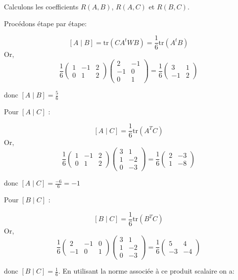 \documentclass[
]{article}
\begin{document}
Calculons les coefficients \(R(A ,B)\), \(R(A ,C)\) et \(R(B ,C)\).

Procédons étape par étape:

\[[ A \mid B] = \text{tr}(CA^tWB)= \frac{1}{6}\text{tr}(A^tB)\] Or,
\[\frac{1}{6} \begin{pmatrix}
1 & -1 & 2 \\
0 & 1 & 2
\end{pmatrix} \begin{pmatrix}
2 & -1  \\
-1 & 0 \\
0 & 1 
\end{pmatrix} = \frac{1}{6} \begin{pmatrix}
3 & 1  \\
-1 & 2 
\end{pmatrix}\]

donc \([A \mid B] = \frac{5}{6}\)

Pour \([A \mid C]\) :

\[
[A \mid C] = \frac{1}{6} \text{tr}(A^T C) \] Or,
\[ \frac{1}{6} \begin{pmatrix} 
1 & -1 & 2 \\ 
0 & 1 & 2 
\end{pmatrix} \begin{pmatrix} 
3 & 1 \\ 
1 & -2 \\ 
0 & -3 
\end{pmatrix} = \frac{1}{6} \begin{pmatrix}
2 & -3  \\
1 & -8 
\end{pmatrix}\]

donc \([A \mid C] = \frac{-6}{6} = -1\)

Pour \([B \mid C]\) :

\[
[B \mid C] = \frac{1}{6} \text{tr}(B^T C) \] Or,
\[ \frac{1}{6} \begin{pmatrix} 
2 & -1 & 0 \\ 
-1 & 0 & 1 
\end{pmatrix} \begin{pmatrix} 
3 & 1 \\ 
1 & -2 \\ 
0 & -3 
\end{pmatrix} = \frac{1}{6} \begin{pmatrix}
5 & 4  \\
-3 & -4 
\end{pmatrix}
\]

donc \([B \mid C] = \frac{1}{6}\). En utilisant la norme associée à ce
produit scalaire on a:
\end{document}
